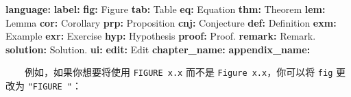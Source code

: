 \documentclass[
  12pt,
]{krantz}
\newenvironment{Shaded}{\begin{snugshade}}{\end{snugshade}}
\newcommand{\AttributeTok}[1]{\textcolor[rgb]{0.13,0.29,0.53}{#1}}
\newcommand{\FunctionTok}[1]{\textcolor[rgb]{0.13,0.29,0.53}{\textbf{#1}}}
\newcommand{\KeywordTok}[1]{\textcolor[rgb]{0.13,0.29,0.53}{\textbf{#1}}}
\newcommand{\StringTok}[1]{\textcolor[rgb]{0.31,0.60,0.02}{#1}}
\theoremstyle{definition}
\theoremstyle{definition}
\theoremstyle{definition}
\theoremstyle{definition}
\theoremstyle{remark}
\begin{document}
\begin{Shaded}
\begin{Highlighting}[]
\FunctionTok{language}\KeywordTok{:}
\AttributeTok{  }\FunctionTok{label}\KeywordTok{:}
\AttributeTok{    }\FunctionTok{fig}\KeywordTok{:}\AttributeTok{ }\StringTok{\textquotesingle{}Figure \textquotesingle{}}
\AttributeTok{    }\FunctionTok{tab}\KeywordTok{:}\AttributeTok{ }\StringTok{\textquotesingle{}Table \textquotesingle{}}
\AttributeTok{    }\FunctionTok{eq}\KeywordTok{:}\AttributeTok{ }\StringTok{\textquotesingle{}Equation \textquotesingle{}}
\AttributeTok{    }\FunctionTok{thm}\KeywordTok{:}\AttributeTok{ }\StringTok{\textquotesingle{}Theorem \textquotesingle{}}
\AttributeTok{    }\FunctionTok{lem}\KeywordTok{:}\AttributeTok{ }\StringTok{\textquotesingle{}Lemma \textquotesingle{}}
\AttributeTok{    }\FunctionTok{cor}\KeywordTok{:}\AttributeTok{ }\StringTok{\textquotesingle{}Corollary \textquotesingle{}}
\AttributeTok{    }\FunctionTok{prp}\KeywordTok{:}\AttributeTok{ }\StringTok{\textquotesingle{}Proposition \textquotesingle{}}
\AttributeTok{    }\FunctionTok{cnj}\KeywordTok{:}\AttributeTok{ }\StringTok{\textquotesingle{}Conjecture \textquotesingle{}}
\AttributeTok{    }\FunctionTok{def}\KeywordTok{:}\AttributeTok{ }\StringTok{\textquotesingle{}Definition \textquotesingle{}}
\AttributeTok{    }\FunctionTok{exm}\KeywordTok{:}\AttributeTok{ }\StringTok{\textquotesingle{}Example \textquotesingle{}}
\AttributeTok{    }\FunctionTok{exr}\KeywordTok{:}\AttributeTok{ }\StringTok{\textquotesingle{}Exercise \textquotesingle{}}
\AttributeTok{    }\FunctionTok{hyp}\KeywordTok{:}\AttributeTok{ }\StringTok{\textquotesingle{}Hypothesis \textquotesingle{}}
\AttributeTok{    }\FunctionTok{proof}\KeywordTok{:}\AttributeTok{ }\StringTok{\textquotesingle{}Proof. \textquotesingle{}}
\AttributeTok{    }\FunctionTok{remark}\KeywordTok{:}\AttributeTok{ }\StringTok{\textquotesingle{}Remark. \textquotesingle{}}
\AttributeTok{    }\FunctionTok{solution}\KeywordTok{:}\AttributeTok{ }\StringTok{\textquotesingle{}Solution. \textquotesingle{}}
\AttributeTok{  }\FunctionTok{ui}\KeywordTok{:}
\AttributeTok{    }\FunctionTok{edit}\KeywordTok{:}\AttributeTok{ Edit}
\AttributeTok{    }\FunctionTok{chapter\_name}\KeywordTok{:}\AttributeTok{ }\StringTok{\textquotesingle{}\textquotesingle{}}
\AttributeTok{    }\FunctionTok{appendix\_name}\KeywordTok{:}\AttributeTok{ }\StringTok{\textquotesingle{}\textquotesingle{}}
\end{Highlighting}
\end{Shaded}

  例如，如果你想要将使用 \texttt{FIGURE\ x.x} 而不是 \texttt{Figure\ x.x}，你可以将 \texttt{fig} 更改为 \texttt{"FIGURE\ "}：
\end{document}
